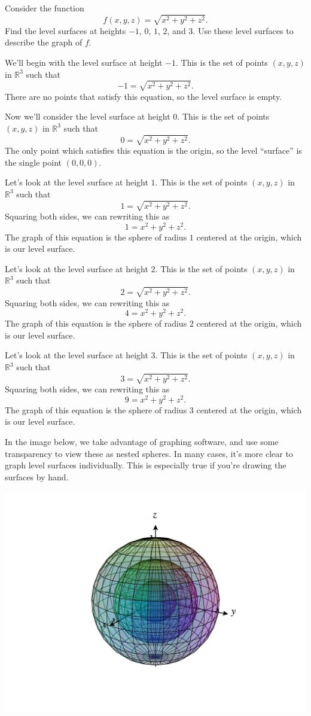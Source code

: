 \documentclass{ximera}
\begin{document}
\begin{example}
Consider the function
\[
f(x,y,z) = \sqrt{x^2 + y^2 + z^2}.
\]
Find the level surfaces at heights $-1$, $0$, $1$, $2$, and $3$. Use these level surfaces to describe the graph of $f$.

We'll begin with the level surface at height $-1$. This is the set of points $(x,y,z)$ in $\mathbb{R}^3$ such that
\[
-1 = \sqrt{x^2+y^2+z^2}.
\]
There are no points that satisfy this equation, so the level surface is empty.

Now we'll consider the level surface at height $0$. This is the set of points $(x,y,z)$ in $\mathbb{R}^3$ such that
\[
0 = \sqrt{x^2+y^2+z^2}.
\]
The only point which satisfies this equation is the origin, so the level ``surface'' is the single point $(0,0,0)$.

Let's look at the level surface at height $1$. This is the set of points $(x,y,z)$ in $\mathbb{R}^3$ such that
\[
1 = \sqrt{x^2+y^2+z^2}.
\]
Squaring both sides, we can rewriting this as 
\[
1 = x^2+y^2+z^2.
\]
The graph of this equation is the sphere of radius $1$ centered at the origin, which is our level surface.

Let's look at the level surface at height $2$. This is the set of points $(x,y,z)$ in $\mathbb{R}^3$ such that
\[
2 = \sqrt{x^2+y^2+z^2}.
\]
Squaring both sides, we can rewriting this as 
\[
4 = x^2+y^2+z^2.
\]
The graph of this equation is the sphere of radius $2$ centered at the origin, which is our level surface.

Let's look at the level surface at height $3$. This is the set of points $(x,y,z)$ in $\mathbb{R}^3$ such that
\[
3 = \sqrt{x^2+y^2+z^2}.
\]
Squaring both sides, we can rewriting this as 
\[
9 = x^2+y^2+z^2.
\]
The graph of this equation is the sphere of radius $3$ centered at the origin, which is our level surface.

In the image below, we take advantage of graphing software, and use some transparency to view these as nested spheres. In many cases, it's more clear to graph level surfaces individually. This is especially true if you're drawing the surfaces by hand.

\begin{image}
\includegraphics[width = \textwidth]{CalcPlot3D-nested_level_surfaces}
\end{image}


\end{example}
\end{document}

